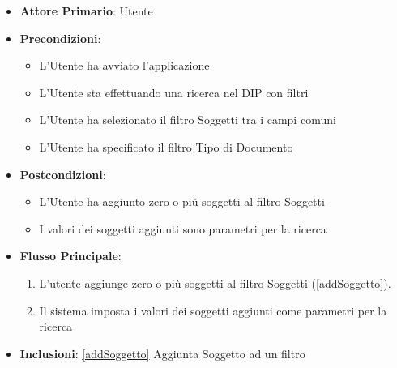 \begin{itemize}
      \item \textbf{Attore Primario}: Utente
      \item \textbf{Precondizioni}: 
      \begin{itemize}
            \item L'Utente ha avviato l'applicazione
            \item L'Utente sta effettuando una ricerca nel DIP con filtri
            \item L'Utente ha selezionato il filtro Soggetti tra i campi comuni
            \item L'Utente ha specificato il filtro Tipo di Documento
      \end{itemize}
      \item \textbf{Postcondizioni}: \begin{itemize}
            \item L'Utente ha aggiunto zero o più soggetti al filtro Soggetti
            \item I valori dei soggetti aggiunti sono parametri per la ricerca
      \end{itemize}
      \item \textbf{Flusso Principale}:
            \begin{enumerate}
                  \item L'utente aggiunge zero o più soggetti al filtro Soggetti (\ref{addSoggetto}).
                  \item Il sistema imposta i valori dei soggetti aggiunti come parametri per la ricerca
            \end{enumerate}
      \item \textbf{Inclusioni}: \ref{addSoggetto} Aggiunta Soggetto ad un filtro
\end{itemize}

